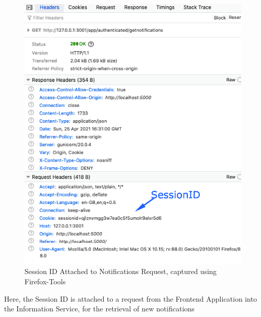 			\begin{figure}[H]
				\iftrue
				\caption{Session ID Attached to Notifications Request, captured using Firefox-Tools}
				\centering
				\includegraphics[scale=0.3]{figures/sessionID}
				\fi
			\end{figure} 
			Here, the Session ID is attached to a request from the Frontend Application into the Information Service, for the retrieval of new notifications
